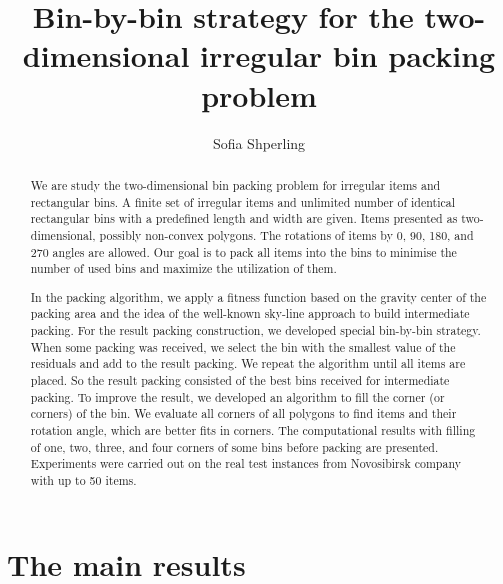 \documentclass[12pt]{llncs}
\begin{document}
\fi
%
\title{Bin-by-bin strategy for the two-dimensional irregular bin packing problem}
\author{Sofia Shperling}


\maketitle

\begin{abstract}

We are study the two-dimensional bin packing problem for irregular items and rectangular bins. A finite set of irregular items and unlimited number of identical rectangular bins with a predefined length and width are given.  Items presented as two-dimensional, possibly non-convex polygons. The rotations of items by 0, 90, 180, and 270 angles are allowed. Our goal is to pack all items into the bins to minimise the number of used bins and maximize the utilization of them. 

In the packing algorithm, we apply a fitness function based on the gravity center of the packing area and the idea of the well-known sky-line approach to build intermediate packing. For the result packing construction, we developed special bin-by-bin strategy. When some packing was received, we select the bin with the smallest value of the residuals and add to the result packing. We repeat the algorithm until all items are placed. So the result packing consisted of the best bins received for intermediate packing. To improve the result, we developed an algorithm to fill the corner (or corners) of the bin. We evaluate all corners of all polygons to find items and their rotation angle, which are better fits in corners. The computational results with filling of one, two, three, and four corners of some bins before packing are presented. Experiments were carried out on the real test instances from Novosibirsk company with up to 50 items.

\end{abstract}

\section{The main results}
\end{document}
